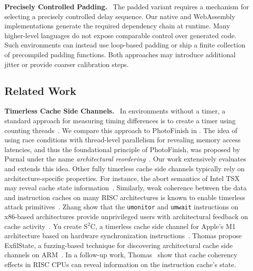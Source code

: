 \documentclass[letterpaper,twocolumn,10pt]{article} %
\newcommand{\paragrabf}[1]{\noindent \textbf{#1.}\ }
\newcommand{\AttackName}{PhotoFinish\xspace}
\begin{document}
\paragrabf{Precisely Controlled Padding}
The padded variant requires a mechanism for selecting a precisely controlled delay sequence.
Our native and WebAssembly implementations generate the required dependency chain at runtime.
Many higher-level languages do not expose comparable control over generated code.
Such environments can instead use loop-based padding or ship a finite collection of precompiled padding functions.
Both approaches may introduce additional jitter or provide coarser calibration steps.

\subsection{Related Work}\label{subsec:related-work}

\paragrabf{Timerless Cache Side Channels}
In environments without a timer, a standard approach for measuring timing differences is to create a timer using counting threads~\cite{Lipp2016,Schwarz2017Timers,Schwarz2020malware}.
We compare this approach to \AttackName in .
The idea of using race conditions with thread-level parallelism for revealing memory access latencies, and thus the foundational principle of \AttackName, was proposed by Purnal \etal under the name \emph{architectural reordering}~\cite{Purnal2023showtime}.
Our work extensively evaluates and extends this idea.
Other fully timerless cache side channels typically rely on architecture-specific properties.
For instance, the abort semantics of Intel TSX may reveal cache state information~\cite{Disselkoen2017prime,kim2022dprime,Hornetz2026tdxray}.
Similarly, weak coherence between the data and instruction caches on many RISC architectures is known to enable timerless attack primitives~\cite{Guanciale2016Cache,Jin2025Ghostcache,Thomas2025Exfilstate,thomas2026riscy}.
Zhang \etal show that the \texttt{umonitor} and \texttt{umwait} instructions on x86-based architectures provide unprivileged users with architectural feedback on cache activity~\cite{Zhang2023MWAIT}.
Yu \etal create S${}^2$C, a timerless cache side channel for Apple's M1 architecture based on hardware synchronization instructions~\cite{Yu2023Synchronization}.
Thomas \etal propose ExfilState, a fuzzing-based technique for discovering architectural cache side channels on ARM~\cite{Thomas2025Exfilstate}.
In a follow-up work, Thomas~\etal\cite{thomas2026riscy} show that cache coherency effects in RISC CPUs can reveal information on the instruction cache's state.
\end{document}
